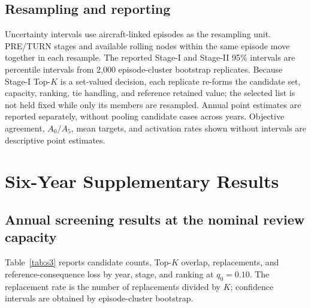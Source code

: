 \documentclass[10pt,a4paper]{article}
\numberwithin{equation}{section}
\begin{document}
\subsection{Resampling and reporting}
Uncertainty intervals use aircraft-linked episodes as the resampling unit. PRE/TURN stages and available rolling nodes within the same episode move together in each resample. The reported Stage-I and Stage-II 95\% intervals are percentile intervals from 2,000 episode-cluster bootstrap replicates. Because Stage-I Top-$K$ is a set-valued decision, each replicate re-forms the candidate set, capacity, ranking, tie handling, and reference retained value; the selected list is not held fixed while only its members are resampled. Annual point estimates are reported separately, without pooling candidate cases across years. Objective agreement, $A_0/A_5$, mean targets, and activation rates shown without intervals are descriptive point estimates.

\section{Six-Year Supplementary Results}
\label{sup:results}

\subsection{Annual screening results at the nominal review capacity}
Table~\ref{tab:s3} reports candidate counts, Top-$K$ overlap, replacements, and reference-consequence loss by year, stage, and ranking at $q_0=0.10$. The replacement rate is the number of replacements divided by $K$; confidence intervals are obtained by episode-cluster bootstrap.
\end{document}
